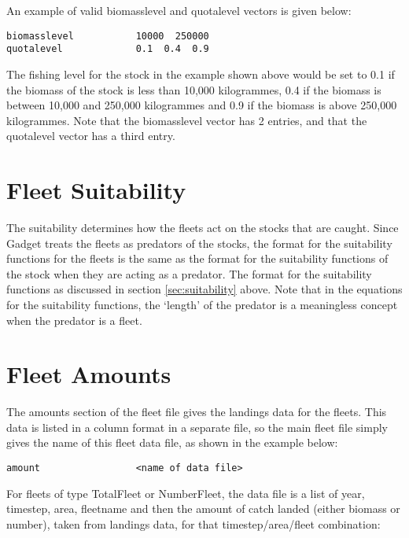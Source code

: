 \documentclass[]{book}
\begin{document}
An example of valid biomasslevel and quotalevel vectors is given below:

\begin{verbatim}
biomasslevel           10000  250000
quotalevel             0.1  0.4  0.9
\end{verbatim}

The fishing level for the stock in the example shown above would be set
to 0.1 if the biomass of the stock is less than 10,000 kilogrammes, 0.4
if the biomass is between 10,000 and 250,000 kilogrammes and 0.9 if the
biomass is above 250,000 kilogrammes. Note that the biomasslevel vector
has 2 entries, and that the quotalevel vector has a third entry.

\hypertarget{sec:fleetsuit}{%
\section{Fleet Suitability}\label{sec:fleetsuit}}

The suitability determines how the fleets act on the stocks that are
caught. Since Gadget treats the fleets as predators of the stocks, the
format for the suitability functions for the fleets is the same as the
format for the suitability functions of the stock when they are acting
as a predator. The format for the suitability functions as discussed in
section \ref{sec:suitability} above. Note that in the equations for the
suitability functions, the `length' of the predator is a meaningless
concept when the predator is a fleet.

\hypertarget{sec:fleetamount}{%
\section{Fleet Amounts}\label{sec:fleetamount}}

The amounts section of the fleet file gives the landings data for the
fleets. This data is listed in a column format in a separate file, so
the main fleet file simply gives the name of this fleet data file, as
shown in the example below:

\begin{verbatim}
amount                 <name of data file>
\end{verbatim}

For fleets of type TotalFleet or NumberFleet, the data file is a list of
year, timestep, area, fleetname and then the amount of catch landed
(either biomass or number), taken from landings data, for that
timestep/area/fleet combination:
\end{document}
